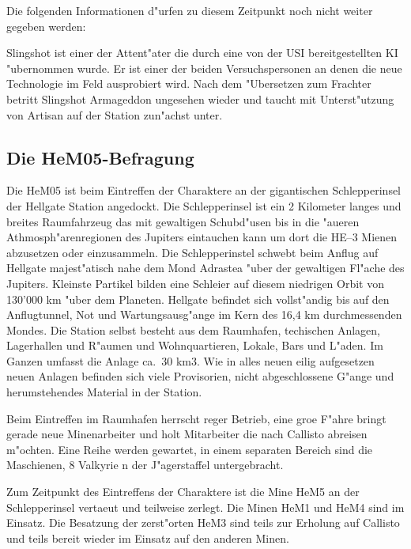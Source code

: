 \begin{remarks}
	Die folgenden Informationen d"urfen zu diesem Zeitpunkt noch nicht weiter gegeben werden:
	
	Slingshot ist einer der Attent"ater die durch eine von der USI bereitgestellten KI "ubernommen wurde. Er ist einer der beiden Versuchspersonen an denen die neue Technologie im Feld ausprobiert wird. Nach dem "Ubersetzen zum Frachter betritt Slingshot Armageddon ungesehen wieder und taucht mit Unterst"utzung von Artisan auf der Station zun"achst unter.
\end{remarks}

\subsection{Die HeM05-Befragung}

Die HeM05 ist beim Eintreffen der Charaktere an der gigantischen Schlepperinsel der Hellgate Station angedockt. Die Schlepperinsel ist ein 2 Kilometer langes und breites Raumfahrzeug das mit gewaltigen Schubd"usen bis in die "au\3eren Athmosph"arenregionen des Jupiters eintauchen kann um dort die HE--3 Mienen abzusetzen oder einzusammeln. Die Schlepperinstel schwebt beim Anflug auf Hellgate majest"atisch nahe dem Mond Adrastea "uber der gewaltigen Fl"ache des Jupiters. Kleinste Partikel bilden eine Schleier auf diesem niedrigen Orbit von 130'000 km "uber dem Planeten. Hellgate befindet sich vollst"andig bis auf den Anflugtunnel, Not und Wartungsausg"ange im Kern des 16,4 km durchmessenden Mondes. Die Station selbst besteht aus dem Raumhafen, techischen Anlagen, Lagerhallen und R"aumen und Wohnquartieren, Lokale, Bars und L"aden. Im Ganzen umfasst die Anlage ca.~30 km\textsc{3}. Wie in alles neuen eilig aufgesetzen neuen Anlagen befinden sich viele Provisorien, nicht abgeschlossene G"ange und herumstehendes Material in der Station.

Beim Eintreffen im Raumhafen herrscht reger Betrieb, eine gro\3e F"ahre bringt gerade neue Minenarbeiter und holt Mitarbeiter die nach Callisto abreisen m"ochten. Eine Reihe werden gewartet, in einem separaten Bereich sind die Maschienen, 8 Valkyrie n der J"agerstaffel untergebracht. 

Zum Zeitpunkt des Eintreffens der Charaktere ist die Mine HeM5 an der Schlepperinsel vertaeut und teilweise zerlegt. Die Minen HeM1 und HeM4 sind im Einsatz. Die Besatzung der zerst"orten HeM3 sind teils zur Erholung auf Callisto und teils bereit wieder im Einsatz auf den anderen Minen.

